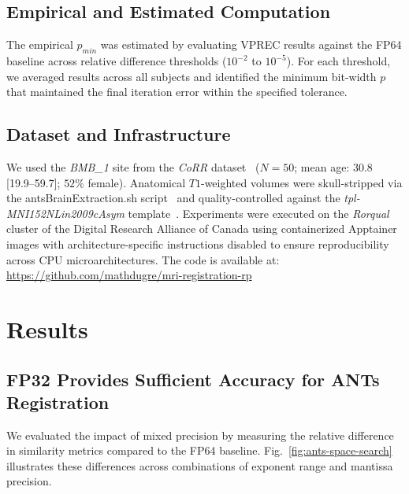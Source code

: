 \documentclass[journal,twoside,web]{ieeecolor}
\begin{document}
\subsection{Empirical and Estimated Computation}
The empirical $p_{min}$ was estimated by evaluating VPREC results against the FP64 baseline across relative difference thresholds ($10^{-2}$ to $10^{-5}$). For each threshold, we averaged results across all subjects and identified the minimum bit-width $p$ that maintained the final iteration error within the specified tolerance.

\subsection{Dataset and Infrastructure}
We used the \textit{BMB\_1} site from the \textit{CoRR} dataset~\cite{Zuo2014-ub} ($N=50$; mean age: $30.8$ [19.9--59.7]; $52\%$ female). Anatomical $T1$-weighted volumes were skull-stripped via the antsBrainExtraction.sh script~\cite{Avants2020-xx,ANTs2023-du} and quality-controlled against the \textit{tpl-MNI152NLin2009cAsym} template~\cite{Ciric2022-mb}. Experiments were executed on the \textit{Rorqual} cluster of the Digital Research Alliance of Canada using containerized Apptainer images with architecture-specific instructions disabled to ensure reproducibility across CPU microarchitectures. The code is available at: \url{https://github.com/mathdugre/mri-registration-rp}

\section{Results}
\label{sec:results}

\subsection{FP32 Provides Sufficient Accuracy for ANTs Registration}
We evaluated the impact of mixed precision by measuring the relative difference in similarity metrics compared to the FP64 baseline. Fig.~\ref{fig:ants-space-search} illustrates these differences across combinations of exponent range and mantissa precision.
\end{document}
